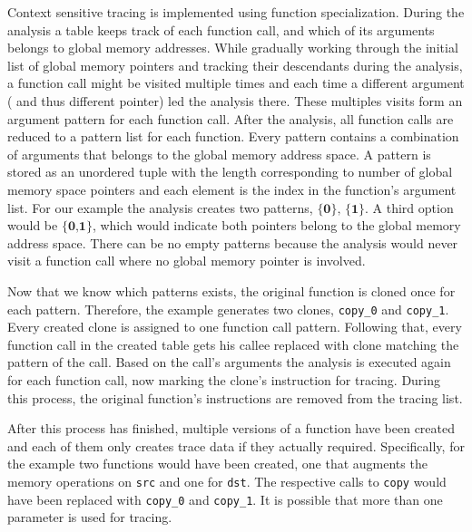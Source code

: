 Context sensitive tracing is implemented using function specialization. During the analysis a table keeps track of each function call, and which of
its arguments belongs to global memory addresses. While gradually working through the initial list of  global memory pointers and tracking their descendants during the analysis, a function call might be visited multiple times and each time a different argument ( and thus different pointer) led the analysis there. These multiples visits form an argument pattern for each function call. After the analysis, all function calls are reduced
to a pattern list for each function. Every pattern contains a combination of arguments that belongs to the global memory address space. A pattern is stored as an unordered tuple with the length corresponding
to number of global memory space pointers and each element is the index in the function's argument list. 
For our example the analysis creates two patterns, $\textbf{\{0\}, \{1\}}$. A third option would be 
 $\textbf{\{0,1\}}$, which would indicate both pointers belong to the global memory address space.
There can be no empty patterns because the analysis would never visit a function call where no global memory pointer is involved.

Now that we know which patterns exists, the original function is cloned once for each pattern. Therefore, the example generates two clones, \verb|copy_0| and \verb|copy_1|. Every created clone is assigned to one function call pattern. Following that, every function call in the created table gets his callee replaced with clone matching the pattern of the call. Based on the call's arguments the analysis is executed again for each function call, now marking the clone's instruction for tracing. During this process, the original function's instructions are removed from the tracing list.

After this process has finished, multiple versions of a function have been created and each of them only creates trace data if they actually required. Specifically, for the example two functions would have been created, one that augments the memory operations on \verb|src| and one for \verb|dst|. The respective calls to \verb|copy| would have been replaced with \verb|copy_0| and \verb|copy_1|. It is possible that more than one parameter is used for tracing.


